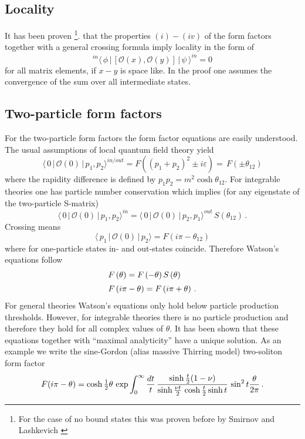 \documentclass[a4paper,12pt]{article}
\begin{document}
\subsection*{Locality}

It has been proven \cite{Q}\footnote{%
For the case of no bound states this was proven before by Smirnov \cite{Sm}
and Lashkevich \cite{Las}}. that the properties $(i)-(iv)$ of the form
factors together with a general crossing formula \cite{BK} imply locality in
the form of 
\[
^{in}\langle \,\phi \,|\,\left[ \mathcal{O}(x),\mathcal{O}(y)\right]
\,|\,\psi \,\rangle ^{in}=0 
\]
for all matrix elements, if $x-y$ is space like. In the proof one assumes
the convergence of the sum over all intermediate states.

\subsection*{Two-particle form factors}

For the two-particle form factors the form factor equations are easily
understood. The usual assumptions of local quantum field theory yield 
\[
\langle \,0\,|\,\mathcal{O}(0)\,|\,p_{1},p_{2}\rangle ^{in/out}=F\left(
(p_{1}+p_{2})^{2}\pm i\varepsilon \right) =\,F\left( \pm \theta _{12}\right) 
\]
where the rapidity difference is defined by $p_{1}p_{2}=m^{2}\cosh \theta
_{12}$. For integrable theories one has particle number conservation which
implies (for any eigenstate of the two-particle S-matrix) 
\[
\langle \,0\,|\,\mathcal{O}(0)\,|\,p_{1},p_{2}\rangle ^{in}=\langle \,0\,|\,%
\mathcal{O}(0)\,|\,p_{2},p_{1}\rangle ^{out}\,S\left( \theta _{12}\right)
\,. 
\]
Crossing means 
\[
\langle \,p_{1}\,|\,\mathcal{O}(0)\,|\,p_{2}\rangle =F\left( i\pi -\theta
_{12}\right) 
\]
where for one-particle states in- and out-states coincide. Therefore
Watson's equations follow 
\[
\begin{array}{l}
F\left( \theta \right) =F\left( -\theta \right) S\left( \theta \right) 
\vspace{5pt} \\ 
F\left( i\pi -\theta \right) =F\left( i\pi +\theta \right) \,.
\end{array}
\]
For general theories Watson's \cite{Wa} equations only hold below particle
production thresholds. However, for integrable theories there is no particle
production and therefore they hold for all complex values of $\theta $. It
has been shown \cite{KW} that these equations together with ``maximal
analyticity'' have a unique solution. As an example we write the sine-Gordon
(alias massive Thirring model) two-soliton form factor \cite{KW} 
\[
F(i\pi -\theta )=\cosh \tfrac{1}{2}\theta \,\exp \int_{0}^{\infty }\frac{dt}{%
t}\,\frac{\sinh \frac{t}{2}(1-\nu )}{\sinh \frac{\nu t}{2}\,\cosh \frac{t}{2}%
\sinh t}\,\sin ^{2}t\frac{\theta }{2\pi }\,. 
\]
\end{document}
